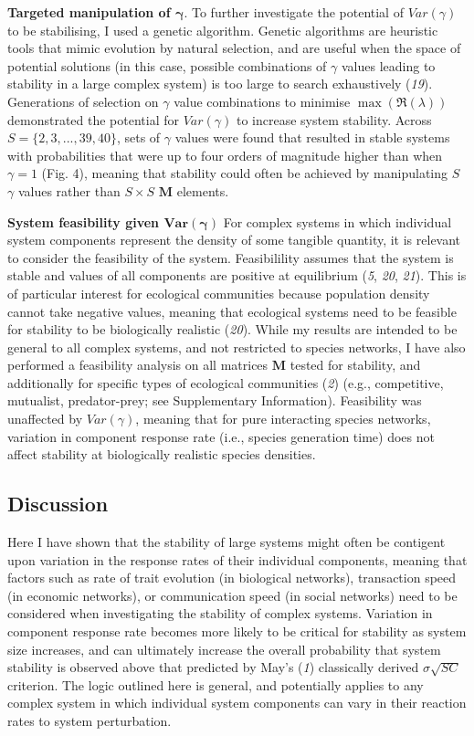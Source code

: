 \documentclass[]{article}
\begin{document}
\textbf{Targeted manipulation of \(\mathbf{\gamma}\)}. To further
investigate the potential of \(Var(\gamma)\) to be stabilising, I used a
genetic algorithm. Genetic algorithms are heuristic tools that mimic
evolution by natural selection, and are useful when the space of
potential solutions (in this case, possible combinations of \(\gamma\)
values leading to stability in a large complex system) is too large to
search exhaustively (\emph{19}). Generations of selection on \(\gamma\)
value combinations to minimise \(\max\left(\Re(\lambda)\right)\)
demonstrated the potential for \(Var(\gamma)\) to increase system
stability. Across \(S = \{2, 3, ..., 39, 40\}\), sets of \(\gamma\)
values were found that resulted in stable systems with probabilities
that were up to four orders of magnitude higher than when \(\gamma = 1\)
(Fig. 4), meaning that stability could often be achieved by manipulating
\(S\) \(\gamma\) values rather than \(S \times S\) \(\mathbf{M}\)
elements.

\textbf{System feasibility given \(\mathbf{Var(\gamma)}\)} For complex
systems in which individual system components represent the density of
some tangible quantity, it is relevant to consider the feasibility of
the system. Feasibilility assumes that the system is stable and values
of all components are positive at equilibrium (\emph{5}, \emph{20},
\emph{21}). This is of particular interest for ecological communities
because population density cannot take negative values, meaning that
ecological systems need to be feasible for stability to be biologically
realistic (\emph{20}). While my results are intended to be general to
all complex systems, and not restricted to species networks, I have also
performed a feasibility analysis on all matrices \(\mathbf{M}\) tested
for stability, and additionally for specific types of ecological
communities (\emph{2}) (e.g., competitive, mutualist, predator-prey; see
Supplementary Information). Feasibility was unaffected by
\(Var(\gamma)\), meaning that for pure interacting species networks,
variation in component response rate (i.e., species generation time)
does not affect stability at biologically realistic species densities.

\subsection{Discussion}\label{discussion}

Here I have shown that the stability of large systems might often be
contigent upon variation in the response rates of their individual
components, meaning that factors such as rate of trait evolution (in
biological networks), transaction speed (in economic networks), or
communication speed (in social networks) need to be considered when
investigating the stability of complex systems. Variation in component
response rate becomes more likely to be critical for stability as system
size increases, and can ultimately increase the overall probability that
system stability is observed above that predicted by May's (\emph{1})
classically derived \(\sigma \sqrt{SC}\) criterion. The logic outlined
here is general, and potentially applies to any complex system in which
individual system components can vary in their reaction rates to system
perturbation.
\end{document}
